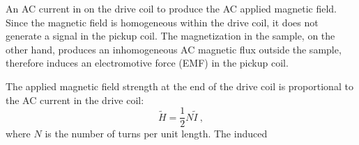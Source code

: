 An AC current in on the drive coil to produce the AC applied magnetic field. Since the magnetic field is homogeneous within the drive coil, it does not generate a signal in the pickup coil. The magnetization in the sample, on the other hand, produces an inhomogeneous AC magnetic flux outside the sample, therefore induces an electromotive force (EMF) in the pickup coil.

The applied magnetic field strength at the end of the drive coil is proportional to the AC current in the drive coil:%
\begin{equation}%
    \widetilde{H} = \frac{1}{2}N\widetilde{I}~,
\end{equation}%
where $N$ is the number of turns per unit length. The induced 